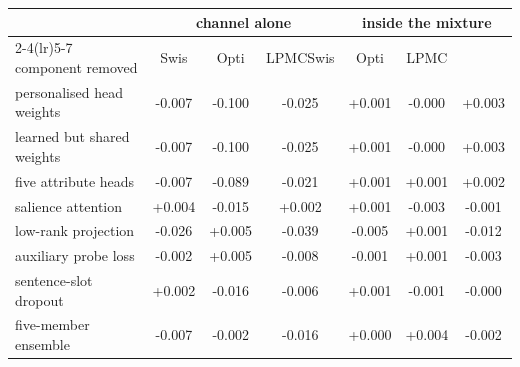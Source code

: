 \begin{tabular}{lcccccc}
\toprule
& \multicolumn{3}{c}{channel alone} & \multicolumn{3}{c}{inside the mixture} \\
\cmidrule(lr){2-4}\cmidrule(lr){5-7}
component removed & Swis & Opti & LPMCSwis & Opti & LPMC \\
\midrule
personalised head weights & -0.007 & -0.100 & -0.025 & +0.001 & -0.000 & +0.003 \\
\quad learned but shared weights & -0.007 & -0.100 & -0.025 & +0.001 & -0.000 & +0.003 \\
five attribute heads & -0.007 & -0.089 & -0.021 & +0.001 & +0.001 & +0.002 \\
salience attention & +0.004 & -0.015 & +0.002 & +0.001 & -0.003 & -0.001 \\
low-rank projection & -0.026 & +0.005 & -0.039 & -0.005 & +0.001 & -0.012 \\
auxiliary probe loss & -0.002 & +0.005 & -0.008 & -0.001 & +0.001 & -0.003 \\
sentence-slot dropout & +0.002 & -0.016 & -0.006 & +0.001 & -0.001 & -0.000 \\
five-member ensemble & -0.007 & -0.002 & -0.016 & +0.000 & +0.004 & -0.002 \\
\bottomrule
\end{tabular}
